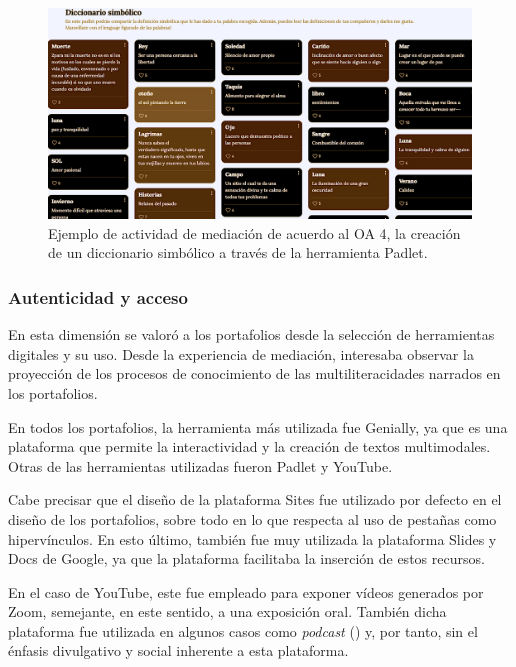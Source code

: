 \begin{figure}[htpb]
\centering
\begin{minipage}{.7\textwidth}
\caption{Ejemplo de actividad de mediación de acuerdo al OA 4, la creación de un diccionario simbólico a través de la herramienta Padlet.}
\label{fig-04}
\includegraphics[width=\textwidth]{fig4.png}
\end{minipage}
\end{figure}

\subsubsection{Autenticidad y acceso}\label{sub-sub-sec-autenticidad}

En esta dimensión se valoró a los portafolios desde la selección de
herramientas digitales y su uso. Desde la experiencia de mediación,
interesaba observar la proyección de los procesos de conocimiento de las
multiliteracidades narrados en los portafolios.

En todos los portafolios, la herramienta más utilizada fue Genially, ya
que es una plataforma que permite la interactividad y la creación de
textos multimodales. Otras de las herramientas utilizadas fueron Padlet
y YouTube.

Cabe precisar que el diseño de la plataforma Sites fue utilizado por
defecto en el diseño de los portafolios, sobre todo en lo que respecta
al uso de pestañas como hipervínculos. En esto último, también fue muy
utilizada la plataforma Slides y Docs de Google, ya que la plataforma
facilitaba la inserción de estos recursos.

En el caso de YouTube, este fue empleado para exponer vídeos generados
por Zoom, semejante, en este sentido, a una exposición oral. También
dicha plataforma fue utilizada en algunos casos como \emph{podcast}
() y, por tanto, sin el énfasis divulgativo y social inherente a
esta plataforma.

